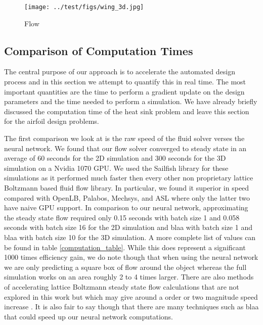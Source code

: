 \documentclass{article} %
\begin{document}
\begin{figure}[h]
\begin{center}
\texttt{[image: ../test/figs/wing\_3d.jpg]}
\end{center}
\caption{Flow}
\end{figure}

\subsection{Comparison of Computation Times}

The central purpose of our approach is to accelerate the automated design process and in this section we attempt to quantify this in real time. The most important quantities are the time to perform a gradient update on the design parameters and the time needed to perform a simulation. We have already briefly discussed the computation time of the heat sink problem and leave this section for the airfoil design problems.

The first comparison we look at is the raw speed of the fluid solver verses the neural network. We found that our flow solver converged to steady state in an average of 60 seconds for the 2D simulation and 300 seconds for the 3D simulation on a Nvidia 1070 GPU. We used the Sailfish library \cite{januszewski2014sailfish} for these simulations as it performed much faster then every other non proprietary lattice Boltzmann based fluid flow library. In particular, we found it superior in speed compared with OpenLB, Palabos, Mechsys, and ASL where only the latter two have naive GPU support. In comparison to our neural network, approximating the steady state flow required only 0.15 seconds with batch size 1 and 0.058 seconds with batch size 16 for the 2D simulation and blaa with batch size 1 and blaa with batch size 10 for the 3D simulation. A more complete list of values can be found in table \ref{computation_table}. While this does represent a significant 1000 times efficiency gain, we do note though that when using the neural network we are only predicting a square box of flow around the object whereas the full simulation works on an area roughly 2 to 4 times larger. There are also methods of accelerating lattice Boltzmann steady state flow calculations that are not explored in this work but which may give around a order or two magnitude speed increase \cite{guo2013lattice} \cite{bernaschi2002computing}. It is also fair to say though that there are many techniques such as blaa that could speed up our neural network computations.
\end{document}
